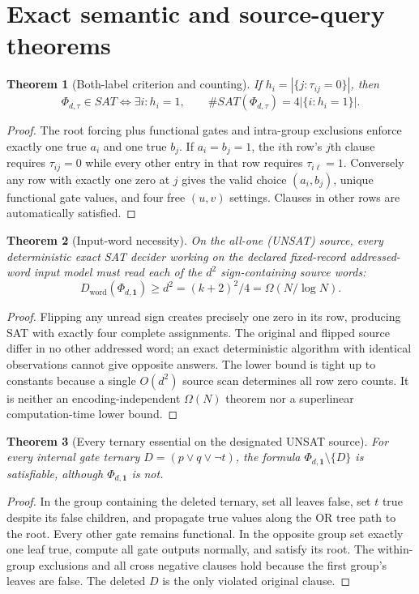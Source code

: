 \documentclass[11pt]{article}
\newtheorem{theorem}{Theorem}
\begin{document}
\section{Exact semantic and source-query theorems}
\begin{theorem}[Both-label criterion and counting]
If $h_i=|\{j:\tau_{ij}=0\}|$, then
\[
\Phi_{d,\tau}\in SAT\iff \exists i:h_i=1,\qquad
\#SAT(\Phi_{d,\tau})=4|\{i:h_i=1\}|.
\]
\end{theorem}
\begin{proof}
The root forcing plus functional gates and intra-group exclusions enforce exactly one true $a_i$ and one true $b_j$. If $a_i=b_j=1$, the $i$th row's $j$th clause requires $\tau_{ij}=0$ while every other entry in that row requires $\tau_{i\ell}=1$. Conversely any row with exactly one zero at $j$ gives the valid choice $(a_i,b_j)$, unique functional gate values, and four free $(u,v)$ settings. Clauses in other rows are automatically satisfied.
\end{proof}
\begin{theorem}[Input-word necessity]
On the all-one (UNSAT) source, every deterministic exact SAT decider working on the declared fixed-record addressed-word input model must read each of the $d^2$ sign-containing source words:
\[
D_{\mathrm{word}}(\Phi_{d,\mathbf 1})\ge d^2=(k+2)^2/4=\Omega(N/\log N).
\]
\end{theorem}
\begin{proof}
Flipping any unread sign creates precisely one zero in its row, producing SAT with exactly four complete assignments. The original and flipped source differ in no other addressed word; an exact deterministic algorithm with identical observations cannot give opposite answers. The lower bound is tight up to constants because a single $O(d^2)$ source scan determines all row zero counts. It is neither an encoding-independent $\Omega(N)$ theorem nor a superlinear computation-time lower bound.
\end{proof}
\begin{theorem}[Every ternary essential on the designated UNSAT source]
For every internal gate ternary $D=(p\lor q\lor\neg t)$, the formula $\Phi_{d,\mathbf1}\setminus\{D\}$ is satisfiable, although $\Phi_{d,\mathbf1}$ is not.
\end{theorem}
\begin{proof}
In the group containing the deleted ternary, set all leaves false, set $t$ true despite its false children, and propagate true values along the OR tree path to the root. Every other gate remains functional. In the opposite group set exactly one leaf true, compute all gate outputs normally, and satisfy its root. The within-group exclusions and all cross negative clauses hold because the first group's leaves are false. The deleted $D$ is the only violated original clause.
\end{proof}
\end{document}

